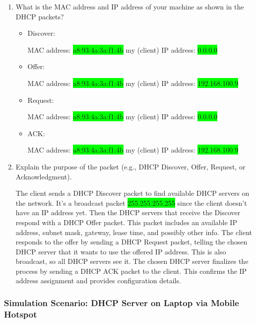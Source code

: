 \documentclass[a4paper]{article}
\begin{document}
	\begin{enumerate}
		\item What is the MAC address and IP address of your machine as shown in the DHCP packets?
		
		\begin{itemize}
			\item Discover:
				
				MAC address: \colorbox{lime}{a8:93:4a:3a:f1:4b} \qquad\qquad my (client) IP address: \colorbox{lime}{0.0.0.0}
				
			\item Offer:
			
				MAC address: \colorbox{lime}{a8:93:4a:3a:f1:4b} \qquad\qquad my (client) IP address: \colorbox{lime}{192.168.100.9}
				
			\item Request:
			
				MAC address: \colorbox{lime}{a8:93:4a:3a:f1:4b} \qquad\qquad my (client) IP address: \colorbox{lime}{0.0.0.0}
			
			\item ACK:
			
				MAC address: \colorbox{lime}{a8:93:4a:3a:f1:4b} \qquad\qquad my (client) IP address: \colorbox{lime}{192.168.100.9}
		\end{itemize}
		
		\item Explain the purpose of the packet (e.g., DHCP Discover, Offer, Request, or Acknowledgment).
		
		The client sends a DHCP Discover packet to find available DHCP servers on the network. It’s a broadcast packet \colorbox{lime}{255.255.255.255} since the client doesn’t have an IP address yet. Then the DHCP servers that receive the Discover respond with a DHCP Offer packet. This packet includes an available IP address, subnet mask, gateway, lease time, and possibly other info. The client responds to the offer by sending a DHCP Request packet, telling the chosen DHCP server that it wants to use the offered IP address. This is also broadcast, so all DHCP servers see it. The chosen DHCP server finalizes the process by sending a DHCP ACK packet to the client. This confirms the IP address assignment and provides configuration details.
		
	\end{enumerate}
	
	\subsubsection{Simulation Scenario: DHCP Server on Laptop via Mobile Hotspot}
	
\end{document}

